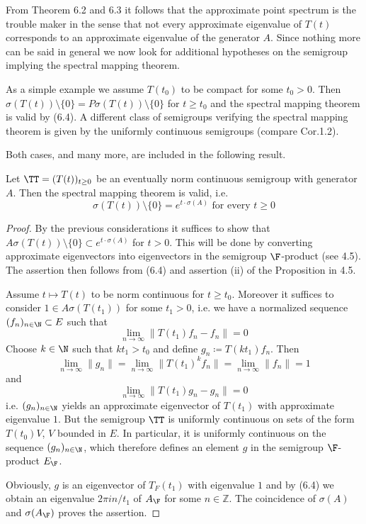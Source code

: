 From Theorem 6.2 and 6.3 it follows that the approximate point spectrum is the trouble maker in the sense that not every approximate eigenvalue of $T(t)$ corresponds to an approximate eigenvalue of the generator $A$.
Since nothing more can be said in general we now look for additional hypotheses on the semigroup implying the spectral mapping theorem.

As a simple example we assume $T(t_{0})$ to be compact for some $t_{0} > 0$.
Then $\sigma(T(t)) \setminus \{0\} = P\sigma(T(t)) \setminus \{0\}$ for $t \geq t_{0}$ and the spectral mapping theorem is valid by (6.4).
A different class of semigroups verifying the spectral mapping theorem is given by the uniformly continuous semigroups (compare Cor.1.2).

Both cases, and many more, are included in the following result.


\newpage
\begin{theorem}\label{thm:a3-6.6}
Let $\TT = (T(t))_{t\geq 0}$ be an eventually norm continuous semigroup with generator $A$.
Then the spectral mapping theorem is valid, i.e.
\[
\sigma(T(t)) \setminus \{0\} = e^{t \cdot \sigma(A)} \text{ for every } t \geq 0
\]
\end{theorem}

\begin{proof}
By the previous considerations it suffices to show that $A\sigma(T(t)) \setminus \{0\} \subset e^{t \cdot \sigma(A)}$ for $t > 0$.
This will be done by converting approximate eigenvectors into eigenvectors in the semigroup $\F$-product (see 4.5).
The assertion then follows from (6.4) and assertion (ii) of the Proposition in 4.5.

Assume $t \mapsto T(t)$ to be norm continuous for $t \geq t_{0}$.
Moreover it suffices to consider $1 \in A\sigma(T(t_{1}))$ for some $t_{1} > 0$, i.e. we have a normalized sequence $(f_{n})_{n\in\N} \subset E$ such that
\[
\lim_{n\to\infty} \|T(t_{1})f_{n} - f_{n}\| = 0
\]
Choose $k \in \N$ such that $kt_{1} > t_{0}$ and define $g_{n} \coloneqq T(kt_{1})f_{n}$.
Then
\[
\lim_{n\to\infty}\|g_{n}\| = \lim_{n\to\infty}\|T(t_{1})^{k}f_{n}\| = \lim_{n\to\infty}\|f_{n}\| = 1
\]
and
\[
\lim_{n\to\infty} \|T(t_{1})g_{n} - g_{n}\| = 0
\]
i.e. $(g_{n})_{n\in\N}$ yields an approximate eigenvector of $T(t_{1})$ with approximate eigenvalue $1$.
But the semigroup $\TT$ is uniformly continuous on sets of the form $T(t_{0})V$, $V$ bounded in $E$.
In particular, it is uniformly continuous on the sequence $(g_{n})_{n\in\N}$, which therefore defines an element $g$ in the semigroup $\F$-product $E_{\F}$.

Obviously, $g$ is an eigenvector of $T_{F}(t_{1})$ with eigenvalue $1$ and by (6.4) we obtain an eigenvalue $2\pi i n/t_{1}$ of $A_{\F}$ for some $n \in \mathbb{Z}$.
The coincidence of $\sigma(A)$ and $\sigma(A_{\F})$ proves the assertion.
\end{proof}

